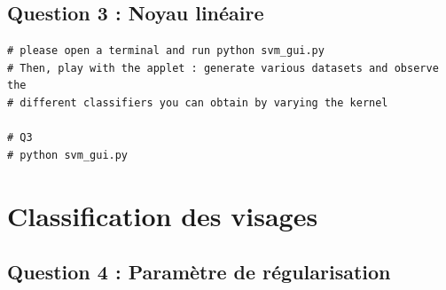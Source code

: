 \documentclass{article}
\begin{document}
\subsection*{Question 3 : Noyau linéaire}

\begin{lstlisting}
# please open a terminal and run python svm_gui.py
# Then, play with the applet : generate various datasets and observe the
# different classifiers you can obtain by varying the kernel

# Q3 
# python svm_gui.py
\end{lstlisting}

\section*{Classification des visages}
\subsection*{Question 4 : Paramètre de régularisation}
\end{document}
